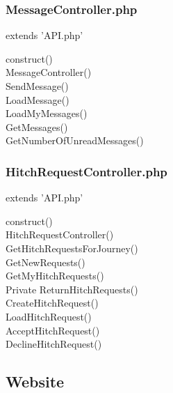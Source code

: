 \documentclass[11pt]{article}
\begin{document}
\subsubsection{Message\textunderscore Controller.php}
extends 'API.php'
\begin{description}
\item[\textunderscore \textunderscore construct()]
\item[Message\textunderscore Controller()]
\item[SendMessage()]
\item[LoadMessage()]
\item[LoadMyMessages()]
\item[GetMessages()]
\item[GetNumberOfUnreadMessages()]
\end{description}

\subsubsection{Hitch\textunderscore Request\textunderscore Controller.php}
extends 'API.php'
\begin{description}
\item[\textunderscore \textunderscore construct()]
\item[Hitch\textunderscore Request\textunderscore Controller()]
\item[GetHitchRequestsForJourney()]
\item[GetNewRequests()]
\item[GetMyHitchRequests()]
\item[Private ReturnHitchRequests()]
\item[CreateHitchRequest()]
\item[LoadHitchRequest()]
\item[AcceptHitchRequest()]
\item[DeclineHitchRequest()]
\end{description}

\subsection{Website}
\end{document}

